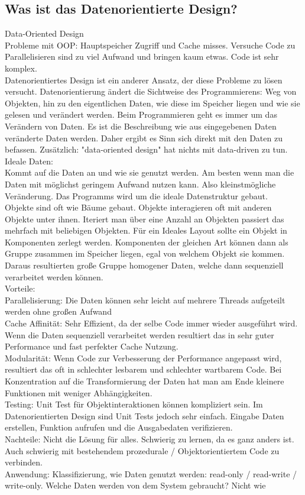 \documentclass[12pt, titlepage]{article}
\begin{document}
\subsection{Was ist das Datenorientierte Design?}
Data-Oriented Design \cite{Data-OrientedDesign}\\
Probleme mit OOP: Hauptspeicher Zugriff und Cache misses. Versuche Code zu Parallelisieren sind zu viel Aufwand und bringen kaum etwas. Code ist sehr komplex.\\Datenorientiertes Design ist ein anderer Ansatz, der diese Probleme zu lösen versucht. Datenorientierung ändert die Sichtweise des Programmierens: Weg von Objekten, hin zu den eigentlichen Daten, wie diese im Speicher liegen und wie sie gelesen und verändert werden. Beim Programmieren geht es immer um das Verändern von Daten. Es ist die Beschreibung wie aus eingegebenen Daten veränderte Daten werden. Daher ergibt es Sinn sich direkt mit den Daten zu befassen. Zusätzlich: "data-oriented design" hat nichts mit \glqq data-driven\grqq{} zu tun.\\ Ideale Daten:\\Kommt auf die Daten an und wie sie genutzt werden. Am besten wenn man die Daten mit möglichst geringem Aufwand nutzen kann. Also kleinstmögliche Veränderung. Das Programms wird um die ideale Datenstruktur gebaut.\\Objekte sind oft wie Bäume gebaut. Objekte interagieren oft mit anderen Objekte \glqq unter\grqq{} ihnen. Iteriert man über eine Anzahl an Objekten passiert das mehrfach mit beliebigen Objekten. Für ein Ideales Layout sollte ein Objekt in Komponenten zerlegt werden. Komponenten der gleichen Art können dann als Gruppe zusammen im Speicher liegen, egal von welchem Objekt sie kommen. Daraus resultierten große Gruppe homogener Daten, welche dann sequenziell verarbeitet werden können.\\Vorteile:\\Parallelisierung: Die Daten können sehr leicht auf mehrere Threads aufgeteilt werden ohne großen Aufwand\\Cache Affinität: Sehr Effizient, da der selbe Code immer wieder ausgeführt wird. Wenn die Daten sequenziell verarbeitet werden resultiert das in sehr guter Performance und fast perfekter Cache Nutzung.\\Modularität: Wenn Code zur Verbesserung der Performance angepasst wird, resultiert das oft in schlechter lesbarem und schlechter wartbarem Code. Bei Konzentration auf die Transformierung der Daten hat man am Ende kleinere Funktionen mit weniger Abhängigkeiten.\\Testing: Unit Test für Objektinteraktionen können kompliziert sein. Im Datenorientierten Design sind Unit Tests jedoch sehr einfach. Eingabe Daten erstellen, Funktion aufrufen und die Ausgabedaten verifizieren.\\Nachteile: Nicht die Lösung für alles. Schwierig zu lernen, da es ganz anders ist. Auch schwierig mit bestehendem prozedurale / Objektorientiertem Code zu verbinden.\\Anwendung: Klassifizierung, wie Daten genutzt werden: read-only / read-write / write-only. Welche Daten werden von dem System gebraucht? Nicht wie 
\end{document}
